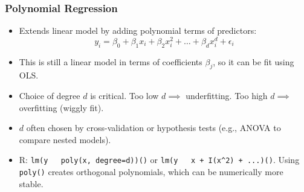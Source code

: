 \documentclass[12pt,a4paper]{article}
\newcommand{\Rfunction}[1]{\texttt{#1()}} %
\begin{document}
\begin{itemize}
    \subsubsection{Polynomial Regression }
        \begin{itemize}
            \item Extends linear model by adding polynomial terms of predictors:
                $$ y_i = \beta_0 + \beta_1 x_i + \beta_2 x_i^2 + \dots + \beta_d x_i^d + \epsilon_i $$
            \item This is still a linear model in terms of coefficients $\beta_j$, so it can be fit using OLS.
            \item Choice of degree $d$ is critical. Too low $d \implies$ underfitting. Too high $d \implies$ overfitting (wiggly fit).
            \item $d$ often chosen by cross-validation or hypothesis tests (e.g., ANOVA to compare nested models).
            \item R: \Rfunction{lm(y ~ poly(x, degree=d))} or \Rfunction{lm(y ~ x + I(x\textasciicircum{}2) + ...)}. Using \Rfunction{poly} creates orthogonal polynomials, which can be numerically more stable.
        \end{itemize}


\end{itemize}
\end{document}
